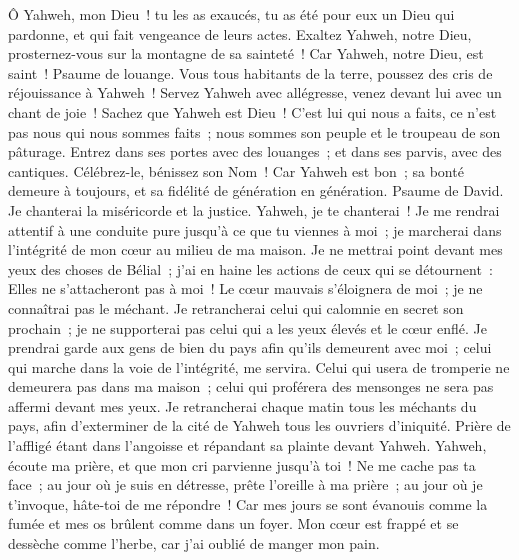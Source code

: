 \begin{multicols}{2}
Ô Yahweh, mon Dieu~! tu les as exaucés, tu as été pour eux un Dieu qui pardonne, et qui fait vengeance de leurs actes.
Exaltez Yahweh, notre Dieu, prosternez-vous sur la montagne de sa sainteté~! Car Yahweh, notre Dieu, est saint~!
\VerseOne{}Psaume de louange. Vous tous habitants de la terre, poussez des cris de réjouissance à Yahweh~!
Servez Yahweh avec allégresse, venez devant lui avec un chant de joie~!
Sachez que Yahweh est Dieu~! C'est lui qui nous a faits, ce n'est pas nous qui nous sommes faits~; nous sommes son peuple et le troupeau de son pâturage.
Entrez dans ses portes avec des louanges~; et dans ses parvis, avec des cantiques. Célébrez-le, bénissez son Nom~!
Car Yahweh est bon~; sa bonté demeure à toujours, et sa fidélité de génération en génération.
\VerseOne{}Psaume de David. Je chanterai la miséricorde et la justice. Yahweh, je te chanterai~!
Je me rendrai attentif à une conduite pure jusqu'à ce que tu viennes à moi~; je marcherai dans l'intégrité de mon cœur au milieu de ma maison.
Je ne mettrai point devant mes yeux des choses de Bélial~; j'ai en haine les actions de ceux qui se détournent~: Elles ne s'attacheront pas à moi~!
Le cœur mauvais s'éloignera de moi~; je ne connaîtrai pas le méchant.
Je retrancherai celui qui calomnie en secret son prochain~; je ne supporterai pas celui qui a les yeux élevés et le cœur enflé.
Je prendrai garde aux gens de bien du pays afin qu'ils demeurent avec moi~; celui qui marche dans la voie de l'intégrité, me servira.
Celui qui usera de tromperie ne demeurera pas dans ma maison~; celui qui proférera des mensonges ne sera pas affermi devant mes yeux.
Je retrancherai chaque matin tous les méchants du pays, afin d'exterminer de la cité de Yahweh tous les ouvriers d'iniquité.
\VerseOne{}Prière de l'affligé étant dans l'angoisse et répandant sa plainte devant Yahweh.
Yahweh, écoute ma prière, et que mon cri parvienne jusqu'à toi~!
Ne me cache pas ta face~; au jour où je suis en détresse, prête l'oreille à ma prière~; au jour où je t'invoque, hâte-toi de me répondre~!
Car mes jours se sont évanouis comme la fumée et mes os brûlent comme dans un foyer.
Mon cœur est frappé et se dessèche comme l'herbe, car j'ai oublié de manger mon pain.

\end{multicols}
